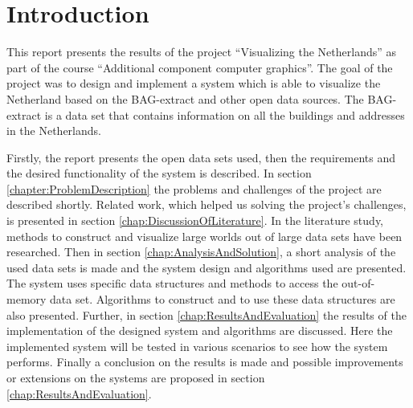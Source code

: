 \chapter{Introduction}
\label{chap:Introduction}
This report presents the results of the project “Visualizing the Netherlands” as part of the course “Additional component computer graphics”. The goal of the project was to design and implement a system which is able to visualize the Netherland based on the BAG-extract \cite{BAG14} and other open data sources. The BAG-extract is a data set that contains information on all the buildings and addresses in the Netherlands.

Firstly, the report presents the open data sets used, then the requirements and the desired functionality of the system is described. In section \ref{chapter:ProblemDescription} the problems and challenges of the project are described shortly. Related work, which helped us solving the project’s challenges, is presented in section \ref{chap:DiscussionOfLiterature}. In the literature study, methods to construct and visualize large worlds out of large data sets have been researched. Then in section \ref{chap:AnalysisAndSolution}, a short analysis of the used data sets is made and the system design and algorithms used are presented. The system uses specific data structures and methods to access the out-of-memory data set. Algorithms to construct and to use these data structures are also presented. Further, in section \ref{chap:ResultsAndEvaluation} the results of the implementation of the designed system and algorithms are discussed. Here the implemented system will be tested in various scenarios to see how the system performs. Finally a conclusion on the results is made and possible improvements or extensions on the systems are proposed in section \ref{chap:ResultsAndEvaluation}.

